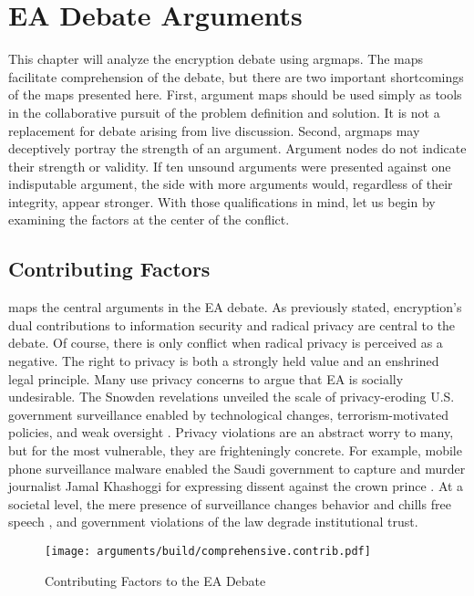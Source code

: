 \chapter{EA Debate Arguments}
\label{chap-arguments}

This chapter will analyze the \ac{encryption} debate using \acp{argmap}. The maps facilitate comprehension of the
debate, but there are two important shortcomings of the maps presented here. First, argument maps should be used simply
as tools in the collaborative pursuit of the problem definition and solution. It is not a replacement for debate arising
from live discussion. Second, \acp{argmap} may deceptively portray the strength of an argument. Argument nodes do not
indicate their strength or validity. If ten unsound arguments were presented against one indisputable argument, the side
with more arguments would, regardless of their integrity, appear stronger. With those qualifications in mind, let us
begin by examining the factors at the center of the conflict.


\section{Contributing Factors}
\label{sed-arg-contrib}

 maps the central arguments in the EA debate. As previously stated, \ac{encryption}'s dual
contributions to information security and radical privacy are central to the debate. Of course, there is only conflict
when radical privacy is perceived as a negative. The right to privacy is both a strongly held value and an enshrined
legal principle. Many use privacy concerns to argue that \ac{EA} is socially undesirable. The Snowden revelations
\cite{landau_making_2013} unveiled the scale of privacy-eroding U.S. government surveillance enabled by technological
changes, terrorism-motivated policies, and weak oversight \cite{shamsi_2011}. Privacy violations are an abstract worry
to many, but for the most vulnerable, they are frighteningly concrete. For example, mobile phone surveillance malware
enabled the Saudi government to capture and murder journalist Jamal Khashoggi for expressing dissent against the crown
prince \cite{liebermann_2019}. At a societal level, the mere presence of surveillance changes behavior and chills free
speech \cite{rogaway_moral_2015}, and government violations of the law degrade institutional trust.

\begin{sidewaysfigure}
  \centering\CaptionFontSize
  \texttt{[image: arguments/build/comprehensive.contrib.pdf]}
  \caption{Contributing Factors to the EA Debate}
  \label{fig-args-contrib}
\end{sidewaysfigure}

